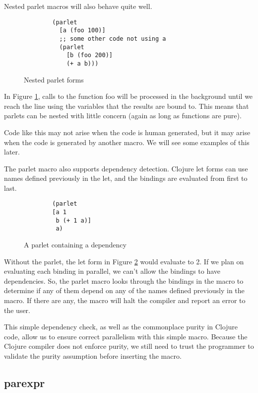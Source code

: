 \documentclass{sig-alternate}
\begin{document}
Nested parlet macros will also behave quite well.

\begin{figure}[h]
    \begin{verbatim}
        (parlet
          [a (foo 100)]
          ;; some other code not using a
          (parlet
            [b (foo 200)]
            (+ a b)))
    \end{verbatim}
    \caption{Nested parlet forms}
    \label{fig:parlet_noblock}
\end{figure}

In Figure \ref{fig:parlet_noblock}, calls to the function foo will be processed in the background until we reach the line using the variables that the results are bound to.
This means that parlets can be nested with little concern (again as long as functions are pure).

Code like this may not arise when the code is human generated, but it may arise when the code is generated by another macro.
We will see some examples of this later.

The parlet macro also supports dependency detection.
Clojure let forms can use names defined previously in the let, and the bindings are evaluated from first to last.

\begin{figure}[h]
    \begin{verbatim}
        (parlet
        [a 1
         b (+ 1 a)]
         a)
    \end{verbatim}
    \caption{A parlet containing a dependency}
    \label{fig:parlet_dep}
\end{figure}

Without the parlet, the let form in Figure \ref{fig:parlet_dep} would evaluate to 2.
If we plan on evaluating each binding in parallel, we can't allow the bindings to have dependencies.
So, the parlet macro looks through the bindings in the macro to determine if any of them depend on
any of the names defined previously in the macro.
If there are any, the macro will halt the compiler and report an error to the user.

This simple dependency check, as well as the commonplace purity in Clojure code, allow us to ensure correct parallelism with this simple macro.
Because the Clojure compiler does not enforce purity, we still need to trust the programmer to validate the purity assumption before inserting the macro.

\subsection{parexpr}
\end{document}

